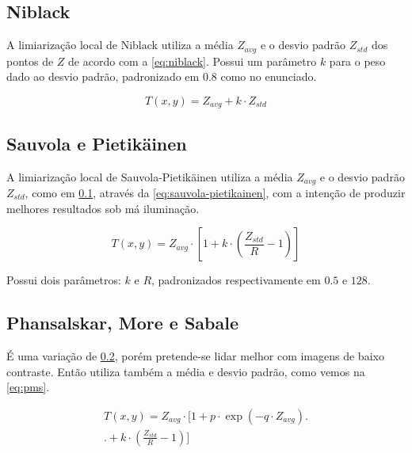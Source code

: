 \documentclass[brazilian,a4paper,twocolumn]{article}
\begin{document}
    \subsection{Niblack}
    \label{sec:niblack}

        A limiarização local de Niblack utiliza a média $Z_{avg}$ e o desvio padrão $Z_{std}$ dos pontos de $Z$ de acordo com a \cref{eq:niblack}. Possui um parâmetro $k$ para o peso dado ao desvio padrão, padronizado em $0.8$ como no enunciado.

        \begin{equation}
        \label{eq:niblack}
            T(x, y) = Z_{avg} + k \cdot Z_{std}
        \end{equation}

    \subsection{Sauvola e Pietikäinen}
    \label{sec:sauvola-pietikainen}

        A limiarização local de Sauvola-Pietikäinen utiliza a média $Z_{avg}$ e o desvio padrão $Z_{std}$, como em \ref{sec:niblack}, através da \cref{eq:sauvola-pietikainen}, com a intenção de produzir melhores resultados sob má iluminação.

        \begin{equation}
        \label{eq:sauvola-pietikainen}
            T(x, y) = Z_{avg} \cdot \left[ 1 +  k \cdot \left( \frac{Z_{std}}{R} - 1\right) \right]
        \end{equation}

        Possui dois parâmetros: $k$ e $R$, padronizados respectivamente em $0.5$ e $128$.

    \subsection{Phansalskar, More e Sabale}

        É uma variação de \ref{sec:sauvola-pietikainen}, porém pretende-se lidar melhor com imagens de baixo contraste. Então utiliza também a média e desvio padrão, como vemos na \cref{eq:pms}.

        \begin{multline}
        \label{eq:pms}
            T(x, y) = Z_{avg} \cdot \Biggl[ 1 +  p \cdot \exp{ \left( -q \cdot Z_{avg} \right) } \Biggr. \\ \Biggl. + k \cdot \left( \frac{Z_{std}}{R} - 1 \right) \Biggr]
        \end{multline}
\end{document}
